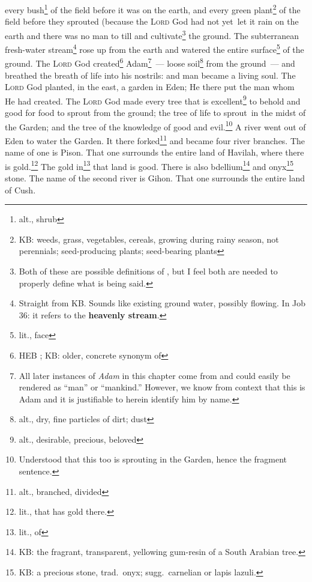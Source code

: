 \begin{inparaenum}
     every bush\footnote{alt., shrub} of the field before it was on the earth, and every green plant\footnote{KB: weeds, grass, vegetables, cereals, growing during rainy season, not perennials; seed-producing plants; seed-bearing plants} of the field before they sprouted (because the \textsc{Lord} God had not yet\understood\ let it rain on the earth and there was no man to till and cultivate\footnote{Both of these are possible definitions of , but I feel both are needed to properly define what is being said.} the ground.%
     The subterranean fresh-water stream\footnote{Straight from KB. Sounds like existing ground water, possibly flowing. In Job 36\thinspace: it refers to the \textbf{heavenly stream}.} rose up from the earth and watered the entire surface\footnote{lit., face} of the ground.%
     The \textsc{Lord} God created\footnote{HEB ; KB: older, concrete synonym of } Adam\footnote{All later instances of \textit{Adam} in this chapter come from  and could easily be rendered as ``man'' or ``mankind.'' However, we know from context that this is Adam and it is justifiable to herein identify him by name.}~--- loose soil\footnote{alt., dry, fine particles of dirt; dust} from the ground~--- and breathed the breath of life into his nostrils: and man became a living soul.%
     The \textsc{Lord} God planted, in the east, a garden in Eden; He there put the man whom He had created.%
     The \textsc{Lord} God made every tree that is excellent\footnote{alt., desirable, precious, beloved} to behold and good for food to sprout from the ground; the tree of life to sprout\understood\ in the midst of the Garden; and the tree of the knowledge of good and evil.\footnote{Understood that this too is sprouting in the Garden, hence the fragment sentence.}%
     A river went out of Eden to water the Garden. It there forked\footnote{alt., branched, divided} and became four river branches.%
     The name of one is Pison. That one surrounds the entire land of Havilah, where there is gold.\footnote{lit., that has gold there.}%
     The gold in\footnote{lit., of} that land is good. There is also bdellium\footnote{KB: the fragrant, transparent, yellowing gum-resin of a South Arabian tree.} and onyx\footnote{KB: a precious stone, trad.\ onyx; sugg.\ carnelian or lapis lazuli.} stone.%
     The name of the second river is Gihon. That one surrounds the entire land of Cush.%

\end{inparaenum}
